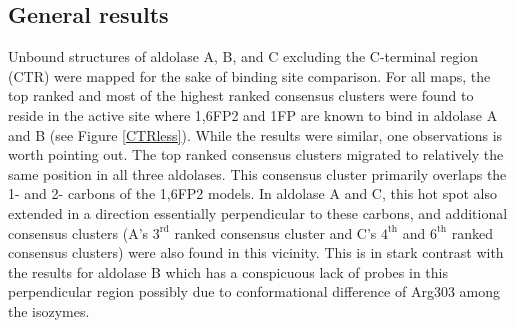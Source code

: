 \documentclass[11pt,a4paper]{article}
\begin{document}
\subsection{General results}
	Unbound structures of aldolase A, B, and C excluding the C-terminal region (CTR) were mapped for the sake of binding site comparison.  For all maps, the top ranked 
	and most of the highest ranked consensus clusters were found to reside in the active site where 1,6FP2 and 1FP are known to bind in aldolase A and B (see 
	Figure \ref{CTRless}).
	While the results were similar, one observations is worth pointing out.  
	The top ranked consensus clusters migrated to relatively the same position in all three aldolases.  This consensus cluster primarily overlaps the 1- and 2- 
	carbons of the 1,6FP2 models.  In aldolase A and C, this hot spot also extended in a direction essentially perpendicular to these carbons, and additional
	consensus clusters (A's $3^\mathrm{rd}$ ranked consensus cluster and C's $4^\mathrm{th}$ and $6^\mathrm{th}$ ranked consensus clusters) were also found in this vicinity.
	This is in stark contrast with the results for aldolase B which has a conspicuous lack of probes in this perpendicular region possibly due 
	to conformational difference of Arg303 among the isozymes.
\end{document}
